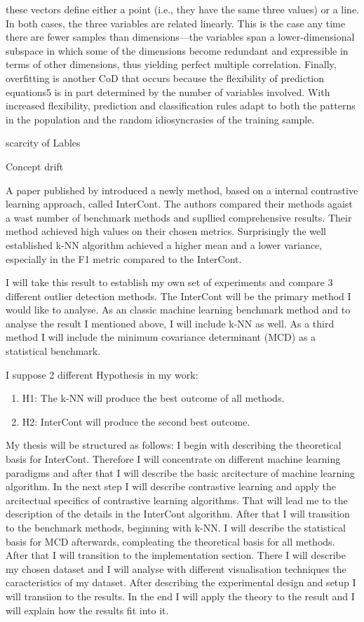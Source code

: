 these vectors define either a point (i.e., they have the same three values) or a line. In both cases, the three variables are related linearly.
This is the case any time there are fewer samples than dimensions—the variables span a lower-dimensional subspace in which some
of the dimensions become redundant and expressible in terms of other dimensions, thus yielding perfect multiple correlation.
Finally, overfitting is another CoD that occurs because the flexibility of prediction equations5 is in part determined
by the number of variables involved. With increased flexibility, prediction and classification rules adapt to both the
patterns in the population and the random idiosyncrasies of the training sample. \citep[p.1pp]{altman2018curse}


scarcity of Lables

Concept drift


A paper published by \citep{shenkar2022anomaly} introduced a newly method, based on a internal contrastive learning approach, called InterCont.
The authors compared their methods agaist a wast number of benchmark methods and supllied comprehensive results.
Their method achieved high values on their chosen metrics. 
Surprisingly the well established k-NN algorithm achieved a higher mean and a lower variance, especially in the F1 metric compared to the InterCont.


I will take this result to establish my own set of experiments and compare 3 different outlier detection methods. 
The InterCont will be the primary method I would like to analyse. 
As an classic machine learning benchmark method and to analyse the result I mentioned above, I will include k-NN as well.
As a third method I will include the minimum covariance determinant (MCD) as a statistical benchmark.


I suppose 2 different Hypothesis in my work:
\begin{enumerate}
    \item H1: The k-NN will produce the best outcome of all methods. 
    \item H2: InterCont will produce the second best outcome. 
\end{enumerate}


My thesis will be structured as follows:
I begin with describing the theoretical basis for InterCont. 
Therefore I will concentrate on different machine learning paradigms and after that I will describe the basic arcitecture of machine learning algorithm.
In the next step I will describe contrastive learning and apply the arcitectual specifics of contrastive learning algorithms.
That will lead me to the description of the details in the InterCont algorithm.
After that I will transition to the benchmark methods, beginning with k-NN.
I will describe the statistical basis for MCD afterwards, compleating the theoretical basis for all methods.
After that I will transition to the implementation section.
There I will describe my chosen dataset and I will analyse with different visualisation techniques the caracteristics of my dataset.
After describing the experimental design and setup I will transiion to the results.
In the end I will apply the theory to the result and I will explain how the results fit into it. 
 